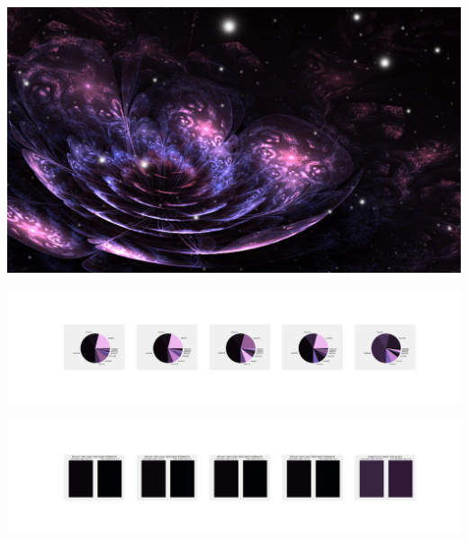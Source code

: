 \documentclass[11pt]{article}
\begin{document}
\begin{landscape}
    \begin{center}
    \includegraphics[width=\textwidth]{./nbimg/file (45).jpg}
    \end{center}

    \begin{center}
    \includegraphics[width=250mm]{./nbimg/pie-389.jpg}
    \end{center}

    \begin{center}
    \includegraphics[width=250mm]{./nbimg/peak-389.jpg}
    \end{center}
    


\end{landscape}
\end{document}
